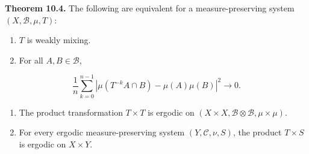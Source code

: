 \textbf{Theorem 10.4.} The following are equivalent for a measure-preserving system $(X, \mathcal{B}, \mu, T)$:

\begin{enumerate}[nosep]
  \item $T$ is weakly mixing.
  \item For all $A, B \in \mathcal{B}$,
\end{enumerate}
\[
\frac{1}{n} \sum_{k=0}^{n-1} \left| \mu(T^{-k}A \cap B) - \mu(A)\mu(B) \right|^2 \to 0.
\]
\begin{enumerate}[nosep]
  \item The product transformation $T \times T$ is ergodic on $(X \times X, \mathcal{B} \otimes \mathcal{B}, \mu \times \mu)$.
  \item For every ergodic measure-preserving system $(Y, \mathcal{C}, \nu, S)$, the product $T \times S$ is ergodic on $X \times Y$.
\end{enumerate}


